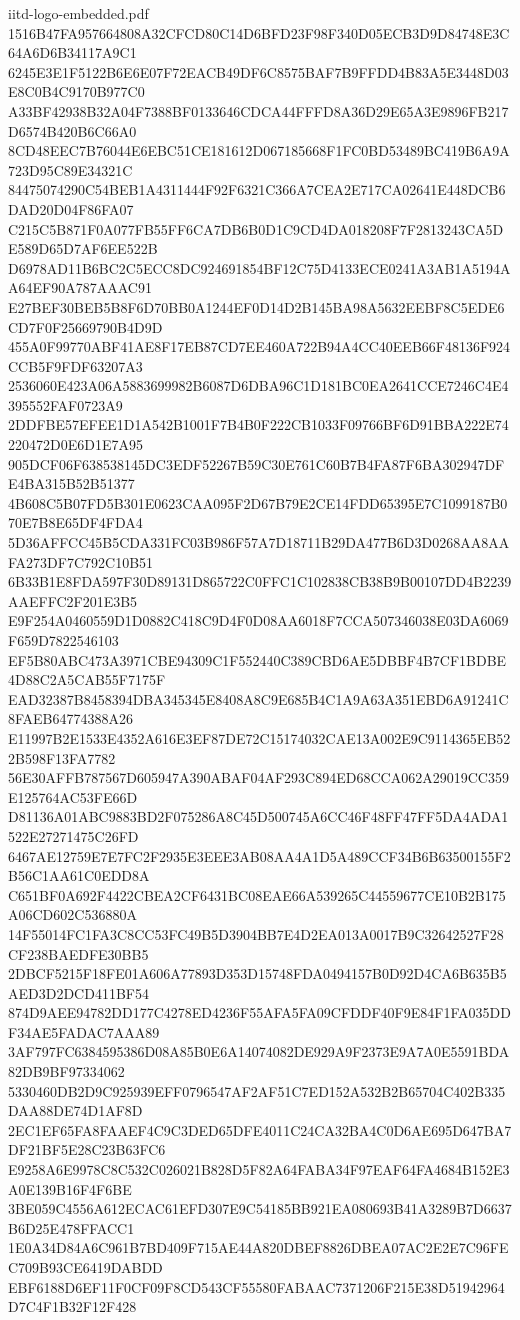 \begin{filecontents*}[overwrite]{iitd-logo-embedded.pdf}
1516B47FA957664808A32CFCD80C14D6BFD23F98F340D05ECB3D9D84748E3C64A6D6B34117A9C1
6245E3E1F5122B6E6E07F72EACB49DF6C8575BAF7B9FFDD4B83A5E3448D03E8C0B4C9170B977C0
A33BF42938B32A04F7388BF0133646CDCA44FFFD8A36D29E65A3E9896FB217D6574B420B6C66A0
8CD48EEC7B76044E6EBC51CE181612D067185668F1FC0BD53489BC419B6A9A723D95C89E34321C
84475074290C54BEB1A4311444F92F6321C366A7CEA2E717CA02641E448DCB6DAD20D04F86FA07
C215C5B871F0A077FB55FF6CA7DB6B0D1C9CD4DA018208F7F2813243CA5DE589D65D7AF6EE522B
D6978AD11B6BC2C5ECC8DC924691854BF12C75D4133ECE0241A3AB1A5194AA64EF90A787AAAC91
E27BEF30BEB5B8F6D70BB0A1244EF0D14D2B145BA98A5632EEBF8C5EDE6CD7F0F25669790B4D9D
455A0F99770ABF41AE8F17EB87CD7EE460A722B94A4CC40EEB66F48136F924CCB5F9FDF63207A3
2536060E423A06A5883699982B6087D6DBA96C1D181BC0EA2641CCE7246C4E4395552FAF0723A9
2DDFBE57EFEE1D1A542B1001F7B4B0F222CB1033F09766BF6D91BBA222E74220472D0E6D1E7A95
905DCF06F638538145DC3EDF52267B59C30E761C60B7B4FA87F6BA302947DFE4BA315B52B51377
4B608C5B07FD5B301E0623CAA095F2D67B79E2CE14FDD65395E7C1099187B070E7B8E65DF4FDA4
5D36AFFCC45B5CDA331FC03B986F57A7D18711B29DA477B6D3D0268AA8AAFA273DF7C792C10B51
6B33B1E8FDA597F30D89131D865722C0FFC1C102838CB38B9B00107DD4B2239AAEFFC2F201E3B5
E9F254A0460559D1D0882C418C9D4F0D08AA6018F7CCA507346038E03DA6069F659D7822546103
EF5B80ABC473A3971CBE94309C1F552440C389CBD6AE5DBBF4B7CF1BDBE4D88C2A5CAB55F7175F
EAD32387B8458394DBA345345E8408A8C9E685B4C1A9A63A351EBD6A91241C8FAEB64774388A26
E11997B2E1533E4352A616E3EF87DE72C15174032CAE13A002E9C9114365EB522B598F13FA7782
56E30AFFB787567D605947A390ABAF04AF293C894ED68CCA062A29019CC359E125764AC53FE66D
D81136A01ABC9883BD2F075286A8C45D500745A6CC46F48FF47FF5DA4ADA1522E27271475C26FD
6467AE12759E7E7FC2F2935E3EEE3AB08AA4A1D5A489CCF34B6B63500155F2B56C1AA61C0EDD8A
C651BF0A692F4422CBEA2CF6431BC08EAE66A539265C44559677CE10B2B175A06CD602C536880A
14F55014FC1FA3C8CC53FC49B5D3904BB7E4D2EA013A0017B9C32642527F28CF238BAEDFE30BB5
2DBCF5215F18FE01A606A77893D353D15748FDA0494157B0D92D4CA6B635B5AED3D2DCD411BF54
874D9AEE94782DD177C4278ED4236F55AFA5FA09CFDDF40F9E84F1FA035DDF34AE5FADAC7AAA89
3AF797FC6384595386D08A85B0E6A14074082DE929A9F2373E9A7A0E5591BDA82DB9BF97334062
5330460DB2D9C925939EFF0796547AF2AF51C7ED152A532B2B65704C402B335DAA88DE74D1AF8D
2EC1EF65FA8FAAEF4C9C3DED65DFE4011C24CA32BA4C0D6AE695D647BA7DF21BF5E28C23B63FC6
E9258A6E9978C8C532C026021B828D5F82A64FABA34F97EAF64FA4684B152E3A0E139B16F4F6BE
3BE059C4556A612ECAC61EFD307E9C54185BB921EA080693B41A3289B7D6637B6D25E478FFACC1
1E0A34D84A6C961B7BD409F715AE44A820DBEF8826DBEA07AC2E2E7C96FEC709B93CE6419DABDD
EBF6188D6EF11F0CF09F8CD543CF55580FABAAC7371206F215E38D51942964D7C4F1B32F12F428

\end{filecontents*}
